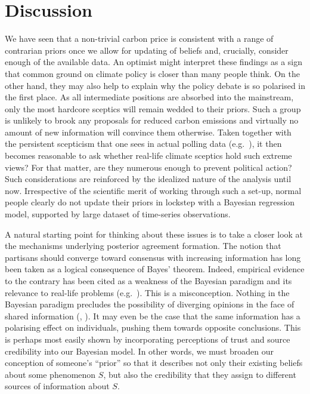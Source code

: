 \documentclass[smallextended]{svjour3}       %
\begin{document}
\hypertarget{sec:discussion}{%
\section{Discussion}\label{sec:discussion}}

We have seen that a non-trivial carbon price is consistent with a range
of contrarian priors once we allow for updating of beliefs and,
crucially, consider enough of the available data. An optimist might
interpret these findings as a sign that common ground on climate policy
is closer than many people think. On the other hand, they may also help
to explain why the policy debate is so polarised in the first place. As
all intermediate positions are absorbed into the mainstream, only the
most hardcore sceptics will remain wedded to their priors. Such a group
is unlikely to brook any proposals for reduced carbon emissions and
virtually no amount of new information will convince them otherwise.
Taken together with the persistent scepticism that one sees in actual
polling data (e.g.~\cite{saad2019americans}), it then becomes reasonable
to ask whether real-life climate sceptics hold such extreme views? For
that matter, are they numerous enough to prevent political action? Such
considerations are reinforced by the idealized nature of the analysis
until now. Irrespective of the scientific merit of working through such
a set-up, normal people clearly do not update their priors in lockstep
with a Bayesian regression model, supported by large dataset of
time-series observations.

A natural starting point for thinking about these issues is to take a
closer look at the mechanisms underlying posterior agreement formation.
The notion that partisans should converge toward consensus with
increasing information has long been taken as a logical consequence of
Bayes' theorem. Indeed, empirical evidence to the contrary has been
cited as a weakness of the Bayesian paradigm and its relevance to
real-life problems (e.g.~\cite{kahneman1972subjective}). This is a
misconception. Nothing in the Bayesian paradigm precludes the
possibility of diverging opinions in the face of shared information
(\cite{jaynes2003probability}, \cite{bullock2009partisan}). It may even
be the case that the same information has a polarising effect on
individuals, pushing them towards opposite conclusions. This is perhaps
most easily shown by incorporating perceptions of trust and source
credibility into our Bayesian model. In other words, we must broaden our
conception of someone's ``prior'' so that it describes not only their
existing beliefs about some phenomenon \(S\), but also the credibility
that they assign to different sources of information about \(S\).
\end{document}
